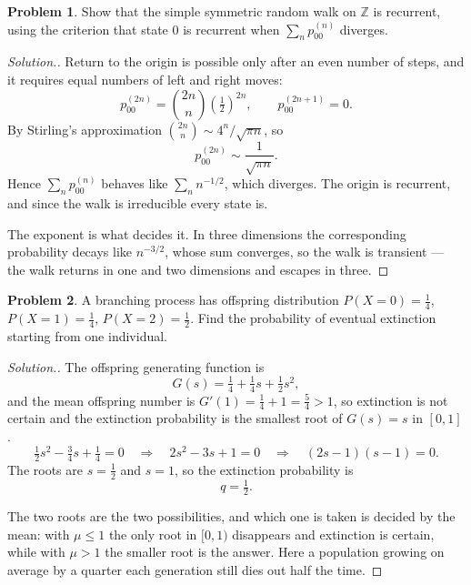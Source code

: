 \documentclass[12pt,a4paper]{report}
\theoremstyle{definition}
\newtheorem{problemx}{Problem}[section]
\newenvironment{problem}{\begin{problemx}}{\end{problemx}}
\newenvironment{solution}
  {\renewcommand{\qedsymbol}{}\begin{proof}[\textit{Solution}.]}
  {\end{proof}}
\begin{document}
\begin{problem}
Show that the simple symmetric random walk on $\mathbb{Z}$ is recurrent, using
the criterion that state $0$ is recurrent when $\sum_n p_{00}^{(n)}$ diverges.
\end{problem}
\begin{solution}
Return to the origin is possible only after an even number of steps, and it
requires equal numbers of left and right moves:
\[p_{00}^{(2n)} = \binom{2n}{n}\left(\tfrac12\right)^{2n},
\qquad p_{00}^{(2n+1)} = 0 .\]
By Stirling's approximation $\binom{2n}{n} \sim 4^{n}/\sqrt{\pi n}$, so
\[p_{00}^{(2n)} \sim \frac{1}{\sqrt{\pi n}} .\]
Hence $\sum_n p_{00}^{(n)}$ behaves like $\sum_n n^{-1/2}$, which diverges. The
origin is recurrent, and since the walk is irreducible every state is.

The exponent is what decides it. In three dimensions the corresponding
probability decays like $n^{-3/2}$, whose sum converges, so the walk is
transient --- the walk returns in one and two dimensions and escapes in three.
\end{solution}

\begin{problem}
\label{prob:branching}
A branching process has offspring distribution $P(X=0)=\tfrac14$,
$P(X=1)=\tfrac14$, $P(X=2)=\tfrac12$. Find the probability of eventual
extinction starting from one individual.
\end{problem}
\begin{solution}
The offspring generating function is
\[G(s) = \tfrac14 + \tfrac14 s + \tfrac12 s^{2},\]
and the mean offspring number is $G'(1) = \tfrac14 + 1 = \tfrac54 > 1$, so
extinction is not certain and the extinction probability is the smallest root of
$G(s)=s$ in $[0,1]$.
\[\tfrac12 s^{2} - \tfrac34 s + \tfrac14 = 0
\quad\Longrightarrow\quad 2s^{2} - 3s + 1 = 0
\quad\Longrightarrow\quad (2s-1)(s-1) = 0 .\]
The roots are $s=\tfrac12$ and $s=1$, so the extinction probability is
\[q = \tfrac12 .\]

The two roots are the two possibilities, and which one is taken is decided by
the mean: with $\mu\leq1$ the only root in $[0,1)$ disappears and extinction is
certain, while with $\mu>1$ the smaller root is the answer. Here a population
growing on average by a quarter each generation still dies out half the time.
\end{solution}
\end{document}
